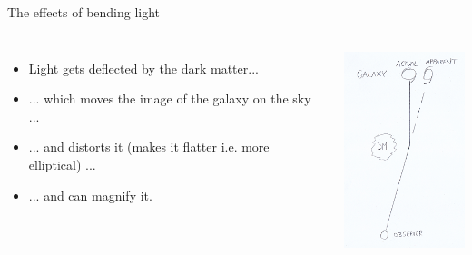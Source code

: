 \documentclass[usenames,dvipsnames]{beamer}
\begin{document}
\begin{frame}{The effects of bending light}
  \begin{columns}
    \begin{itemize}
      \item{Light gets deflected by the dark matter...}
      \item{... which moves the image of the galaxy on the sky ...}
	\item{... and distorts it (makes it flatter i.e. more elliptical) ...}
	\item{... and can magnify it.}
    \end{itemize}
    \centering
    \includegraphics[height=6cm]{diagram_1.png}
  \end{columns}
\end{frame}


 
\end{document}
